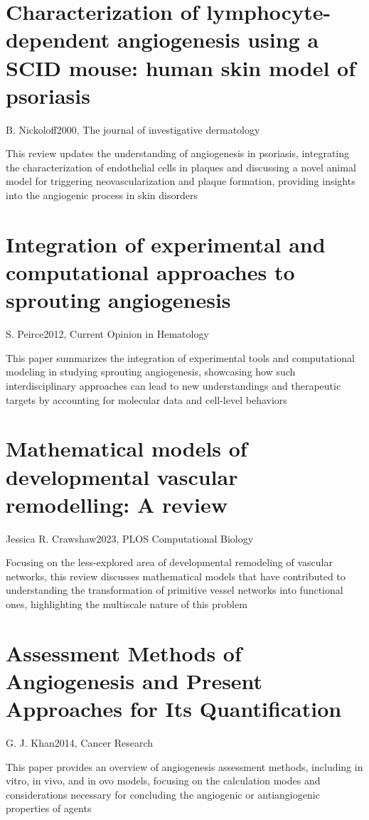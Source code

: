 \section{Characterization of lymphocyte-dependent angiogenesis using a SCID mouse: human skin model of psoriasis}{B. Nickoloff}{2000, The journal of investigative dermatology}

This review updates the understanding of angiogenesis in psoriasis, integrating the characterization of endothelial cells in plaques and discussing a novel animal model for triggering neovascularization and plaque formation, providing insights into the angiogenic process in skin disorders \cite{Nickoloff2000}


\section{Integration of experimental and computational approaches to sprouting angiogenesis}{S. Peirce}{2012, Current Opinion in Hematology}

This paper summarizes the integration of experimental tools and computational modeling in studying sprouting angiogenesis, showcasing how such interdisciplinary approaches can lead to new understandings and therapeutic targets by accounting for molecular data and cell-level behaviors \cite{Peirce2012}

\section{Mathematical models of developmental vascular remodelling: A review}{Jessica R. Crawshaw}{2023, PLOS Computational Biology}

Focusing on the less-explored area of developmental remodeling of vascular networks, this review discusses mathematical models that have contributed to understanding the transformation of primitive vessel networks into functional ones, highlighting the multiscale nature of this problem \cite{Crawshaw2023}

\section{Assessment Methods of Angiogenesis and Present Approaches for Its Quantification}{G. J. Khan}{2014, Cancer Research}

This paper provides an overview of angiogenesis assessment methods, including in vitro, in vivo, and in ovo models, focusing on the calculation modes and considerations necessary for concluding the angiogenic or antiangiogenic properties of agents\cite{Khan2014}


